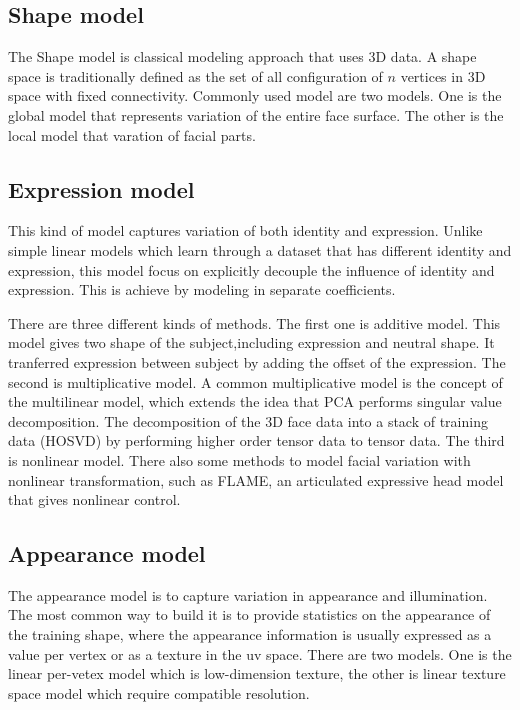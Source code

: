 \subsection{Shape model}

The Shape model is classical modeling approach that uses 3D data. A shape space is traditionally defined as the set of all configuration of $n$ vertices in 3D space with fixed connectivity\citep{dryden2016statistical}. Commonly used model are two models. One is the global model that represents variation of the entire face surface. The other is the local model that varation of facial parts.


\subsection{Expression model}

This kind of model captures variation of both identity and expression. Unlike simple linear models which learn through a dataset that has different identity and expression, this model focus on explicitly decouple the influence of identity and expression\citep{booth20173d}. This is achieve by modeling in separate coefficients. 

There are three different kinds of methods. The first one is additive model. This model gives two shape of the subject,including expression and neutral shape. It tranferred expression between subject by adding the offset of the expression\citep{blanz1999morphable}. The second is multiplicative model. A common multiplicative model is the concept of the multilinear model, which extends the idea that PCA performs singular value decomposition. The decomposition of the 3D face data into a stack of training data (HOSVD) by performing higher order tensor data to tensor data\citep{vlasic2006face}. The third is nonlinear model. There also some methods to model facial variation with nonlinear transformation, such as FLAME, an articulated expressive head model that gives nonlinear control\cite{yu2017learning}.

\subsection{Appearance model}

The appearance model is to capture variation in appearance and illumination. The most common way to build it is to provide statistics on the appearance of the training shape, where the appearance information is usually expressed as a value per vertex or as a texture in the uv space\citep{booth20173d}. There are two models. One is the linear per-vetex model which is low-dimension texture, the other is linear texture space model which require compatible resolution.

